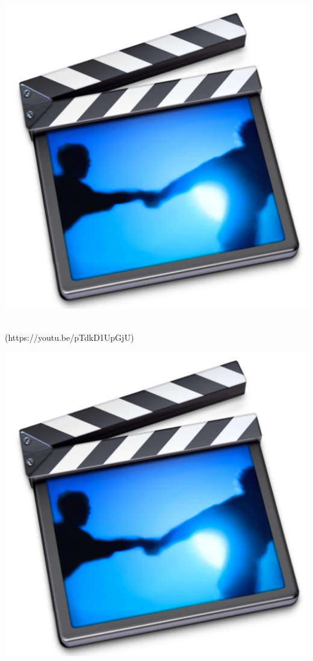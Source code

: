 {\begin{minipage}{\linewidth}
\begin{minipage}{6mm}
\includegraphics[scale=0.03]{Graphics/General/screencast_icon}
\end{minipage}
\href{https://youtu.be/pTdkD1UpGjU}{}\\
(https://youtu.be/pTdkD1UpGjU)\\
\begin{minipage}{6mm}
\includegraphics[scale=0.03]{Graphics/General/screencast_icon}

\end{minipage}
\end{minipage}}
